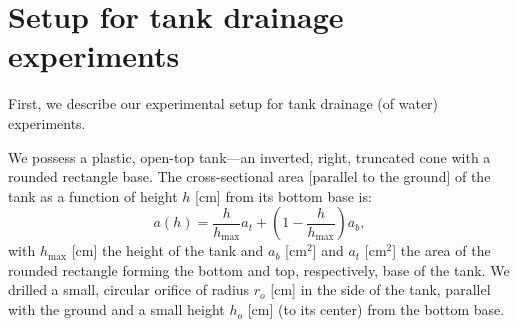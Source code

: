 \documentclass[openacc]{rsproca_new}%
\begin{document}
%




\section{Setup for tank drainage experiments} \label{sec:expt}
First, we describe our experimental setup for tank drainage (of water) experiments.

We possess a plastic, open-top tank---an inverted, right, truncated cone with a rounded rectangle base. 
The cross-sectional area [parallel to the ground] of the tank as a function of height $h$ [cm] from its bottom base is:
\begin{equation}
	a(h) = \frac{h}{h_{\text{max}}}a_t + \left(1-\frac{h}{h_{\text{max}}}\right) a_b, \label{eq:a_of_h}
\end{equation}
with $h_{\text{max}}$ [cm] the height of the tank and $a_b$ [cm$^2$] and $a_t$ [cm$^2$] the area of the rounded rectangle forming the bottom and top, respectively, base of the tank.
We drilled a small, circular orifice of radius $r_o$ [cm] in the side of the tank, parallel with the ground and a small height $h_o$ [cm] (to its center) from the bottom base.
\end{document}
